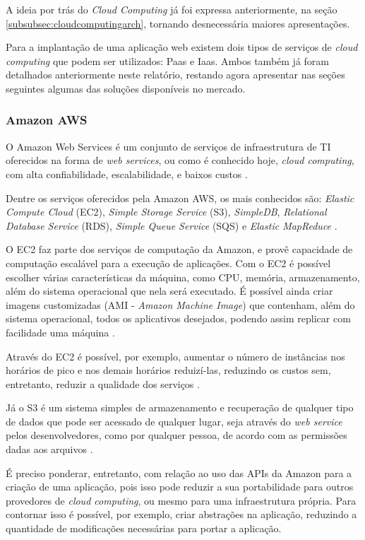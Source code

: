 \documentclass[diss]{template/setrem}
\begin{document}
A ideia por trás do \emph{Cloud Computing} já foi expressa anteriormente, na seção \ref{subsubsec:cloudcomputingarch}, tornando desnecessária maiores apresentações.

Para a implantação de uma aplicação web existem dois tipos de serviços de \emph{cloud computing} que podem ser utilizados: Paas e Iaas. Ambos também já foram detalhados anteriormente neste relatório, restando agora apresentar nas seções seguintes algumas das soluções disponíveis no mercado.

\subsubsection{Amazon AWS}
O Amazon Web Services é um conjunto de serviços de infraestrutura de TI oferecidos na forma de \emph{web services}, ou como é conhecido hoje, \emph{cloud computing}, com alta confiabilidade, escalabilidade, e baixos custos \citep{Amazon2012}.

Dentre os serviços oferecidos pela Amazon AWS, os mais conhecidos são: \emph{Elastic Compute Cloud} (EC2), \emph{Simple Storage Service} (S3), \emph{SimpleDB}, \emph{Relational Database Service} (RDS), \emph{Simple Queue Service} (SQS) e \emph{Elastic MapReduce} \citep{Sousa2009}.

O EC2 faz parte dos serviços de computação da Amazon, e provê capacidade de computação escalável para a execução de aplicações. Com o EC2 é possível escolher várias características da máquina, como CPU, memória, armazenamento, além do sistema operacional que nela será executado. É possível ainda criar imagens customizadas (AMI - \emph{Amazon Machine Image}) que contenham, além do sistema operacional, todos os aplicativos desejados, podendo assim replicar com facilidade uma máquina \citep{Sousa2009}.

Através do EC2 é possível, por exemplo, aumentar o número de instâncias nos horários de pico e nos demais horários reduizí-las, reduzindo os custos sem, entretanto, reduzir a qualidade dos serviços \citep{Sousa2009}.

Já o S3 é um sistema simples de armazenamento e recuperação de qualquer tipo de dados que pode ser acessado de qualquer lugar, seja através do \emph{web service} pelos desenvolvedores, como por qualquer pessoa, de acordo com as permissões dadas aos arquivos \citep{Sousa2009}.

É preciso ponderar, entretanto, com relação ao uso das APIs da Amazon para a criação de uma aplicação, pois isso pode reduzir a sua portabilidade para outros provedores de \emph{cloud computing}, ou mesmo para uma infraestrutura própria. Para contornar isso é possível, por exemplo, criar abstrações na aplicação, reduzindo a quantidade de modificações necessárias para portar a aplicação.
\end{document}
